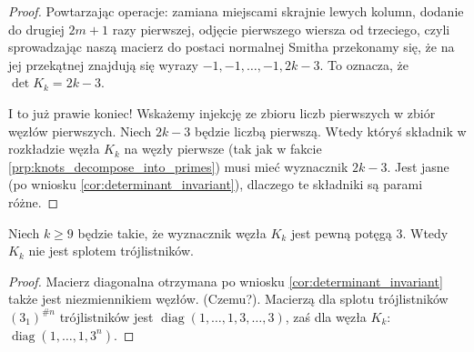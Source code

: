 \begin{proof}
    Powtarzając operacje: zamiana miejscami skrajnie lewych kolumn, dodanie do drugiej $2m+1$ razy pierwszej, odjęcie pierwszego wiersza od trzeciego, czyli sprowadzając naszą macierz do postaci normalnej Smitha przekonamy się, że na jej przekątnej znajdują się wyrazy $-1, -1, \ldots, -1, 2k-3$.
    To oznacza, że $\det K_k = 2k-3$.

    I to już prawie koniec!
    Wskażemy injekcję ze zbioru liczb pierwszych w zbiór węzłów pierwszych.
    Niech $2k-3$ będzie liczbą pierwszą.
    Wtedy któryś składnik w rozkładzie węzła $K_k$ na węzły pierwsze (tak jak w fakcie \ref{prp:knots_decompose_into_primes}) musi mieć wyznacznik $2k-3$.
    Jest jasne (po wniosku \ref{cor:determinant_invariant}), dlaczego te składniki są parami różne.
\end{proof}

\begin{proposition}
    Niech $k \ge 9$ będzie takie, że wyznacznik węzła $K_k$ jest pewną potęgą $3$.
    Wtedy $K_k$ nie jest splotem trójlistników.
\end{proposition}

\begin{proof}
    Macierz diagonalna otrzymana po wniosku \ref{cor:determinant_invariant} także jest niezmiennikiem węzłów.
    (Czemu?).
    Macierzą dla splotu trójlistników $(3_1)^{\# n}$ trójlistników jest $\operatorname{diag}(1, \ldots, 1, 3, \ldots, 3)$, zaś dla węzła $K_k$: $\operatorname{diag} (1, \ldots, 1, 3^n)$.
\end{proof}

%


